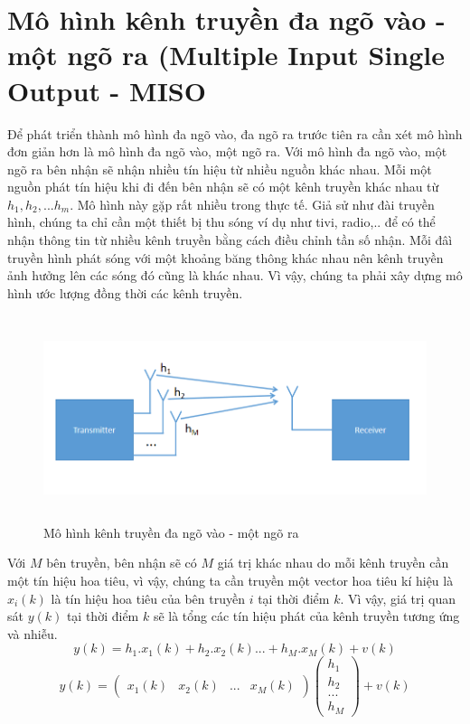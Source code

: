 \documentclass{article}
\begin{document}
\section{Mô hình kênh truyền đa ngõ vào - một ngõ ra (Multiple Input Single Output - MISO}

Để phát triển thành mô hình đa ngõ vào, đa ngõ ra trước tiên ra cần xét mô hình đơn giản hơn là mô hình đa ngõ vào, một ngõ ra. Với mô hình đa ngõ vào, một ngõ ra bên nhận sẽ nhận nhiều tín hiệu từ nhiều nguồn khác nhau. Mỗi một nguồn phát tín hiệu khi đi đến bên nhận sẽ có một kênh truyền khác nhau từ $h_1, h_2,...h_m$. Mô hình này gặp rất nhiều trong thực tế. Giả sử như đài truyền hình, chúng ta chỉ cần một thiết bị thu sóng ví dụ như tivi, radio,.. để có thể nhận thông tin từ nhiều kênh truyền bằng cách điều chỉnh tần số nhận. Mỗi đâì truyền hình phát sóng với một khoảng băng thông khác nhau nên kênh truyền ảnh hưởng lên các sóng đó cũng là khác nhau. Vì vậy, chúng ta phải xây dựng mô hình ước lượng đồng thời các kênh truyền. 

\begin{figure}[h!]
    \centering
  \includegraphics[width=14cm, height =6cm]{photo/6.1.png}
    \caption{Mô hình kênh truyền đa ngõ vào - một ngõ ra}
    \label{Hình 24}
\end{figure}
Với $M$ bên truyền, bên nhận sẽ có $M$ giá trị khác nhau do mỗi kênh truyền cần một tín hiệu hoa tiêu, vì vậy, chúng ta cần truyền một vector hoa tiêu kí hiệu là $x_i(k)$ là tín hiệu hoa tiêu của bên truyền $i$ tại thời điểm $k$. Vì vậy, giá trị quan sát $y(k)$ tại thời điểm $k$ sẽ là tổng các tín hiệu phát của kênh truyền tương ứng và nhiễu.
$$y(k) = h_1.x_1(k) + h_2.x_2(k)...+ h_M.x_M(k) + v(k)$$
$$y(k) = \begin{pmatrix}
    x_1(k)&x_2(k)&...&x_M(k)
\end{pmatrix} \begin{pmatrix}
    h_1\\h_2\\...\\h_M
\end{pmatrix} + v(k)$$
\end{document}
